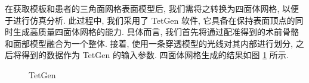 在获取模板和患者的三角面网格表面模型后, 我们需将之转换为四面体网格, 以便于进行仿真分析.
此过程中, 我们采用了 TetGen \cite{siTetGenDelaunaybasedQuality2015} 软件, 它具备在保持表面顶点的同时生成高质量四面体网格的能力.
具体而言, 我们首先将通过配准得到的术前骨骼和面部模型融合为一个整体.
接着, 使用一条穿透模型的光线对其内部进行划分, 之后将得到的数据作为 TetGen 的输入参数.
四面体网格生成的结果如图 \ref{fig:tetgen} 所示.

\begin{figure}
  \centering
  \caption{TetGen}
  \label{fig:tetgen}
\end{figure}
